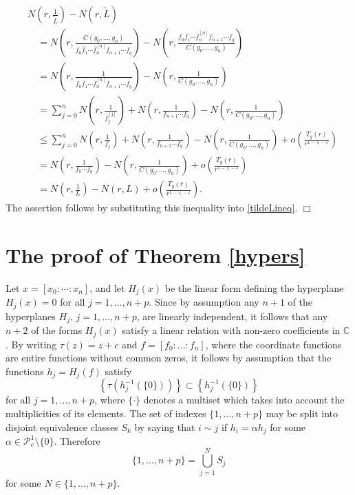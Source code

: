 \documentclass{amsart}
\newcommand{\C}{\mathbb{C}}
\theoremstyle{definition}
\numberwithin{equation}{section}
\numberwithin{theorem}{section}
\begin{document}
    \begin{equation*}
    \begin{split}
    &N\left(r,\frac{1}{\widetilde L}\right)-N(r,\widetilde L) \\ &\quad=  N\left(r,\frac{C(g_0,\ldots,g_n)}{f_0\overline{f}_1\cdots \overline{f}^{[n]}_n f_{n+1}\cdots
    f_q}\right)-N\left(r,\frac{f_0\overline{f}_1\cdots \overline{f}^{[n]}_n f_{n+1}\cdots
    f_q}{C(g_0,\ldots,g_n)}\right) \\ &\quad= N\left(r,\frac{1}{f_0\overline{f}_1\cdots \overline{f}^{[n]}_n f_{n+1}\cdots
    f_q}\right) - N\left(r,\frac{1}{C(g_0,\ldots,g_n)}\right) \\
    &\quad = \sum_{j=0}^n N\left(r,\frac{1}{\overline{f}^{[j]}_j}\right) + N\left(r,\frac{1}{f_{n+1}\cdots
    f_q}\right) - N\left(r,\frac{1}{C(g_0,\ldots,g_n)}\right)\\
    &\quad \leq  \sum_{j=0}^n N\left(r,\frac{1}{f_j}\right)     + N\left(r,\frac{1}{f_{n+1}\cdots
    f_q}\right) - N\left(r,\frac{1}{C(g_0,\ldots,g_n)}\right) + o\left(\frac{T_g(r)}{r^{1-\varsigma-\varepsilon}}\right)
    \\
    &\quad = N\left(r,\frac{1}{f_0\cdots f_q}\right) - N\left(r,\frac{1}{C(g_0,\ldots,g_n)}\right) + o\left(\frac{T_g(r)}{r^{1-\varsigma-\varepsilon}}\right)\\
    &\quad = N\left(r,\frac{1}{L}\right)-N(r,L) + o\left(\frac{T_g(r)}{r^{1-\varsigma-\varepsilon}}\right).
    \end{split}
    \end{equation*}
The assertion follows by substituting this inequality into \eqref{tildeLineq}. \hfill$\Box$

\section{The proof of Theorem \ref{hypers}}\label{section_proofh}

Let $x=[x_0:\cdots:x_n]$, and let $H_j(x)$ be the linear form
defining the hyperplane $H_j(x)=0$ for all $j=1,\ldots,n+p$. Since
by assumption any $n+1$ of the hyperplanes $H_j$,
$j=1,\ldots,n+p$, are linearly independent, it follows
that any $n+2$ of the forms $H_j(x)$ satisfy a linear relation
with non-zero coefficients in $\C$. By writing $\tau(z)=z+c$ and
$f=[f_0:\ldots:f_n]$, where the coordinate functions are entire functions without
common zeros, it follows by assumption that the functions $h_j=H_j(f)$ satisfy
    \begin{equation}\label{shift}
   \left\{ \tau(h_j^{-1}(\{0\}))\right\}\subset
   \left\{h_j^{-1}(\{0\})\right\}
    \end{equation}
for all $j=1,\ldots,n+p$, where $\{\cdot\}$ denotes a multiset which takes into account the multiplicities of its elements. The
set of indexes $\{1,\ldots,n+p\}$ may be split into disjoint
equivalence classes $S_k$ by saying that $i\sim j$ if $h_i=\alpha
h_j$ for some $\alpha\in \mathcal{P}_c^1\setminus\{0\}$. Therefore
    \begin{equation*}
    \{1,\ldots,n+p\}=\bigcup_{j=1}^N S_j
    \end{equation*}
for some $N\in\{1,\ldots,n+p\}$.
\end{document}
